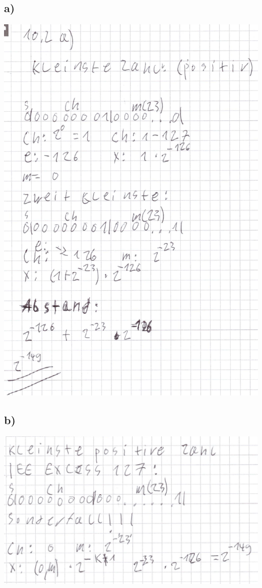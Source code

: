 \documentclass{article}
\begin{document}
	\subsection*{a)}
	\includegraphics[width=\linewidth]{102a}
	\subsection*{b)}
	\includegraphics[width=\linewidth]{102b}
\end{document}

